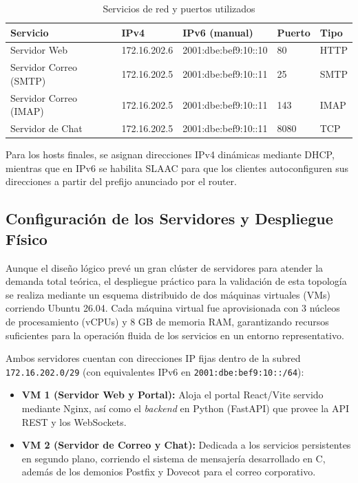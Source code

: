 \begin{table}[H]
\centering
\caption{Servicios de red y puertos utilizados}
\label{tab:servicios}
\begin{tabularx}{\textwidth}{l l l l l}
\toprule
Servicio & IPv4 & IPv6 (manual) & Puerto & Tipo \\
\midrule
Servidor Web & 172.16.202.6 & 2001:dbe:bef9:10::10 & 80 & HTTP \\
Servidor Correo (SMTP) & 172.16.202.5 & 2001:dbe:bef9:10::11 & 25 & SMTP \\
Servidor Correo (IMAP) & 172.16.202.5 & 2001:dbe:bef9:10::11 & 143 & IMAP \\
Servidor de Chat & 172.16.202.5 & 2001:dbe:bef9:10::11 & 8080 & TCP \\
\bottomrule
\end{tabularx}
\end{table}

Para los hosts finales, se asignan direcciones IPv4 dinámicas mediante DHCP, mientras que en IPv6 se habilita SLAAC para que los clientes autoconfiguren sus direcciones a partir del prefijo anunciado por el router.

\subsection{Configuración de los Servidores y Despliegue Físico}

Aunque el diseño lógico prevé un gran clúster de servidores para atender la demanda total teórica, el despliegue práctico para la validación de esta topología se realiza mediante un esquema distribuido de dos máquinas virtuales (VMs) corriendo Ubuntu 26.04. Cada máquina virtual fue aprovisionada con 3 núcleos de procesamiento (vCPUs) y 8 GB de memoria RAM, garantizando recursos suficientes para la operación fluida de los servicios en un entorno representativo.

Ambos servidores cuentan con direcciones IP fijas dentro de la subred \texttt{172.16.202.0/29} (con equivalentes IPv6 en \texttt{2001:dbe:bef9:10::/64}):
\begin{itemize}
    \item \textbf{VM 1 (Servidor Web y Portal):} Aloja el portal React/Vite servido mediante Nginx, así como el \textit{backend} en Python (FastAPI) que provee la API REST y los WebSockets.
    \item \textbf{VM 2 (Servidor de Correo y Chat):} Dedicada a los servicios persistentes en segundo plano, corriendo el sistema de mensajería desarrollado en C, además de los demonios Postfix y Dovecot para el correo corporativo.
\end{itemize}

